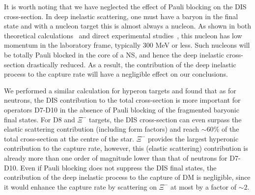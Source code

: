 It is worth noting that we have neglected the effect of Pauli blocking on the DIS cross-section. In deep inelastic scattering, one must have a baryon in the final state and with a nucleon target this is almost always a nucleon. As shown in both theoretical calculations~\cite{Melnitchouk:1992gd_Protonproductionbias} and direct experimental studies~\cite{BEBCWA59:1989ayi_Backwardparticleproduction}, this nucleon has low momentum in the laboratory frame, typically 300 MeV or less. Such nucleons will be totally Pauli blocked in the core of a NS, and hence the deep inelastic cross-section drastically reduced. 
As a result, the contribution of the deep inelastic process to the capture rate will have a negligible effect on our conclusions. 

We performed a similar calculation for hyperon targets and found that as for neutrons, the DIS contribution to the total cross-section is more important for operators D7-D10 in the absence of Pauli blocking of the fragmented baryonic final states. For D8 and  $\Xi^-$ targets, the DIS cross-section can even surpass the elastic scattering contribution (including form factors) and reach $\sim60\%$ of the total cross-section at the centre of the star.  $\Xi^-$ provides the largest hyperonic contribution to the capture rate, however, this (elastic scattering) contribution is already more than one order of magnitude lower than that of neutrons for D7-D10.  
Even if Pauli blocking does not suppress the DIS final states, the contribution of the deep inelastic process to the capture of DM is negligible, since it would enhance the capture rate by scattering on $\Xi^-$ at most by a factor of $\sim2$. 


